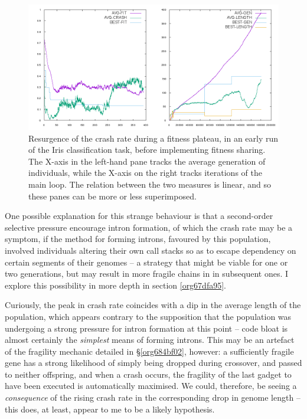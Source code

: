 \documentclass[12pt,glossary]{dalthesis}
\begin{document}
\begin{figure}[htbp]
\centering
\includegraphics[width=.9\linewidth]{../images/plots/good-nosharing.png}
\caption{\label{fig:org742660b}
Resurgence of the crash rate during a fitness plateau, in an early run of the Iris classification task, before implementing fitness sharing. The X-axis in the left-hand pane tracks the average generation of individuals, while the X-axis on the right tracks iterations of the main loop. The relation between the two measures is linear, and so these panes can be more or less superimposed.}
\end{figure}

One possible explanation for this strange behaviour is that a second-order selective
pressure encourage intron formation, of which the crash rate may be a symptom,
if the method for forming introns, favoured by this population, involved individuals
altering their own call stacks so as to escape dependency on certain segments of their
genomes -- a strategy that might be viable for one or two generations, but may result
in more fragile chains in in subsequent ones. I explore this possibility in more
depth in section \ref{org67dfa95}.

Curiously, the peak in crash rate coincides with a dip in the average length of the
population, which appears contrary to the supposition that the population was undergoing
a strong pressure for intron formation at this point -- code bloat is almost certainly
the \emph{simplest} means of forming introns. This may be an artefact of the fragility
mechanic detailed in \S \ref{org684bf02}, however: a sufficiently fragile gene
has a strong likelihood of simply being dropped during crossover, and passed to neither
offspring, and when a crash occurs, the fragility of the last gadget to have been
executed is automatically maximised. We could, therefore, be seeing a \emph{consequence}
of the rising crash rate in the corresponding drop in genome length -- this does, at
least, appear to me to be a likely hypothesis.
\end{document}
